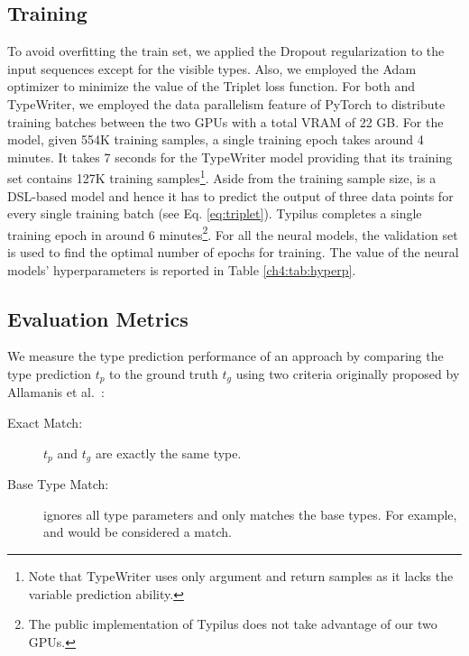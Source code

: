 \subsection{Training}
To avoid overfitting the train set, we applied the Dropout regularization \cite{srivastava2014dropout} to the input sequences except for the visible types. Also, we employed the Adam optimizer \cite{kingma2014adam} to minimize the value of the Triplet loss function. For both \name and TypeWriter, we employed the data parallelism feature of PyTorch to distribute training batches between the two GPUs with a total VRAM of 22 GB.  For the \name model, given 554K training samples, a single training epoch takes around 4 minutes. It takes 7 seconds for the TypeWriter model providing that its training set contains 127K training samples\footnote{Note that TypeWriter uses only argument and return samples as it lacks the variable prediction ability.}. Aside from the training sample size, \name is a DSL-based model and hence it has to predict the output of three data points for every single training batch (see Eq. \ref{eq:triplet}). Typilus completes a single training epoch in around 6 minutes\footnote{The public implementation of Typilus does not take advantage of our two GPUs.}. For all the neural models, the validation set is used to find the optimal number of epochs for training. The value of the neural models' hyperparameters is reported in Table \ref{ch4:tab:hyperp}.

\subsection{Evaluation Metrics}
We measure the type prediction performance of an approach by comparing the type prediction $t_{p}$ to the ground truth $t_{g}$ using two criteria originally proposed by Allamanis et al.~\cite{allamanis2020typilus}:

\begin{description}
	\item[Exact Match:] $t_{p}$ and $t_{g}$ are exactly the same type.
	\item[Base Type Match:] ignores all type parameters and only matches the base types.
	For example,  and  would be considered a match.
\end{description}


